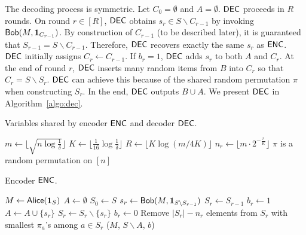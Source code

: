 The decoding process is symmetric.  Let $C_0=\emptyset$ and $A=\emptyset$.  $\textsf{DEC}$ proceeds in $R$ rounds.  On round $r\in[R]$, $\textsf{DEC}$ obtains $s_r\in S\backslash C_{r-1}$ by invoking $\mathsf{Bob}(M, \mathbf{1}_{C_{r-1}})$.  By construction of $C_{r-1}$ (to be described later), it is guaranteed that $S_{r-1}=S\backslash C_{r-1}$.  Therefore, $\textsf{DEC}$ recovers exactly the same $s_r$ as $\textsf{ENC}$.  $\textsf{DEC}$ initially assigns $C_r\leftarrow C_{r-1}$.  If $b_r=1$, $\textsf{DEC}$ adds $s_r$ to both $A$ and $C_r$.  At the end of round $r$, $\textsf{DEC}$ inserts many random items from $B$ into $C_r$ so that $C_r=S\backslash S_r$.  $\textsf{DEC}$ can achieve this because of the shared random permutation $\pi$ when constructing $S_r$.  In the end, $\textsf{DEC}$ outputs $B\cup A$.  We present $\textsf{DEC}$ in Algorithm~\ref{algo:dec}.

\begin{algorithm}[H] 
  \caption{Variables shared by encoder $\textsf{ENC}$ and decoder $\textsf{DEC}$.} \label{algo:para}
  \begin{algorithmic}[1] 
    \State $m\leftarrow \lfloor \sqrt{n \log\frac{1}{\delta}} \rfloor$ 
    \State $K\leftarrow \lfloor \frac{1}{16}\log \frac{1}{\delta} \rfloor$
    \State $R\leftarrow \lfloor K\log(m/4K) \rfloor$
      \State $n_r\leftarrow \lfloor m \cdot 2^{-\frac{r}{K}} \rfloor$
      \newline
    \EndFor
    \State $\pi$ is a random permutation on $[n]$      
    \newline
  \end{algorithmic}
\end{algorithm}

\begin{algorithm}[H] 
  \caption{Encoder $\textsf{ENC}$.} \label{algo:enc}
  \begin{algorithmic}[1]
    \State $M \leftarrow \mathsf{Alice}(\mathbf{1}_S)$
    \State $A\leftarrow \emptyset$        
    \State $S_0 \leftarrow S$       
   \State  {}
      \State $s_r\leftarrow \mathsf{Bob}(M, \mathbf{1}_{S\backslash S_{r-1}})$          
      \State $S_r\leftarrow S_{r-1}$
                  
        \State $b_r\leftarrow 1$         
        \State $A\leftarrow A \cup \{s_r\}$
        \State $S_r\leftarrow S_r \backslash \{s_r\}$
      \Else 
        \State $b_r\leftarrow 0$
      \EndIf
      \State Remove $|S_r|-n_r$ elements from $S_r$ with smallest $\pi_a$'s among $a\in S_r$       \newline
    \EndFor
    \State \Return ($M$, $S\backslash A$, $b$) 
    \EndProcedure
  \end{algorithmic}
\end{algorithm}

